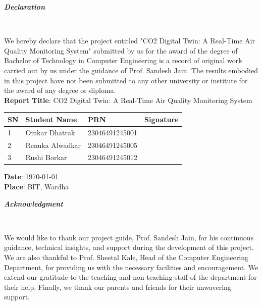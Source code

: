 \documentclass[a4paper, 12pt]{report}
\begin{document}
\thispagestyle{empty}
\begin{center}
\begin{LARGE}
	\textbf{\textit {Declaration}}\end{LARGE}\\[1.2cm]
\end{center}
We hereby declare that the project entitled "CO2 Digital Twin: A Real-Time Air Quality Monitoring System" submitted by us for the award of the degree of Bachelor of Technology in Computer Engineering is a record of original work carried out by us under the guidance of Prof. Sandesh Jain. The results embodied in this project have not been submitted to any other university or institute for the award of any degree or diploma.\\
{\flushleft\textbf{Report Title}: CO2 Digital Twin: A Real-Time Air Quality Monitoring System}\\
\begin{table}[h]
	\begin{tabular}{|p{1cm}|p{5cm}|p{3cm}|p{4cm}|}
		\hline
		\textbf{SN} & \textbf{Student Name} & \textbf{PRN} & \textbf{Signature} \\
		\hline
		1 & Omkar Dhatrak  & 23046491245001 & \\
		\hline
		2 & Renuka Alwadkar & 23046491245005 & \\
		\hline
		3 & Rushi Borkar & 23046491245012 & \\
		\hline
	\end{tabular}
\end{table}
{\flushleft
\textbf{Date}: \today\\
\textbf{Place}: BIT, Wardha  
}
\newpage

\thispagestyle{empty}
\begin{center}
	\begin{LARGE}
		\textbf{\textit {Acknowledgment}}\end{LARGE}\\[1.2cm]
\end{center}
We would like to thank our project guide, Prof. Sandesh Jain, for his continuous guidance, technical insights, and support during the development of this project.
We are also thankful to Prof. Sheetal Kale, Head of the Computer Engineering Department, for providing us with the necessary facilities and encouragement.
We extend our gratitude to the teaching and non-teaching staff of the department for their help. Finally, we thank our parents and friends for their unwavering support.
\newpage
\end{document}
